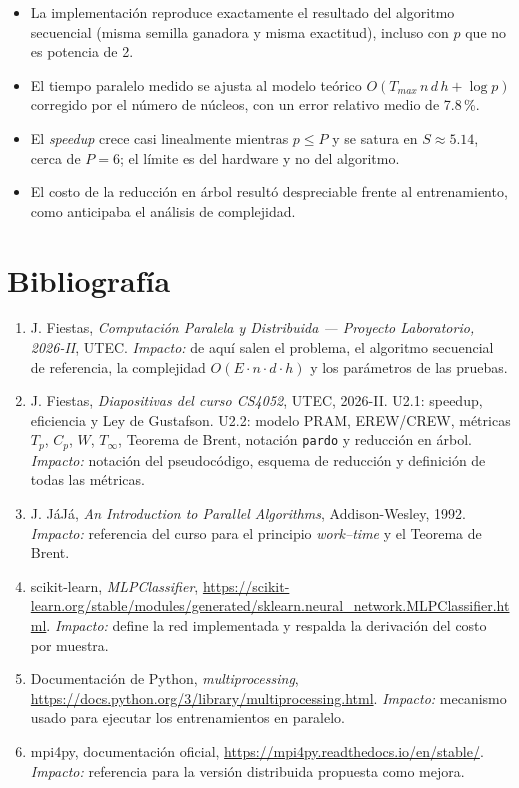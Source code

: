 \documentclass[11pt,a4paper]{article}
\begin{document}
\begin{itemize}[leftmargin=1.2cm]
\item La implementación reproduce exactamente el resultado del algoritmo secuencial (misma semilla ganadora y misma exactitud), incluso con $p$ que no es potencia de 2.
\item El tiempo paralelo medido se ajusta al modelo teórico $O(T_{max}\,n\,d\,h + \log p)$ corregido por el número de núcleos, con un error relativo medio de 7.8\,\%.
\item El \emph{speedup} crece casi linealmente mientras $p \le P$ y se satura en $S \approx 5.14$, cerca de $P = 6$; el límite es del hardware y no del algoritmo.
\item El costo de la reducción en árbol resultó despreciable frente al entrenamiento, como anticipaba el análisis de complejidad.
\end{itemize}

\section{Bibliografía}

\begin{enumerate}[leftmargin=1.2cm]
\item J. Fiestas, \emph{Computación Paralela y Distribuida --- Proyecto Laboratorio, 2026-II}, UTEC. \textit{Impacto:} de aquí salen el problema, el algoritmo secuencial de referencia, la complejidad $O(E\cdot n\cdot d\cdot h)$ y los parámetros de las pruebas.
\item J. Fiestas, \emph{Diapositivas del curso CS4052}, UTEC, 2026-II. U2.1: speedup, eficiencia y Ley de Gustafson. U2.2: modelo PRAM, EREW/CREW, métricas $T_p$, $C_p$, $W$, $T_\infty$, Teorema de Brent, notación \texttt{pardo} y reducción en árbol. \textit{Impacto:} notación del pseudocódigo, esquema de reducción y definición de todas las métricas.
\item J. JáJá, \emph{An Introduction to Parallel Algorithms}, Addison-Wesley, 1992. \textit{Impacto:} referencia del curso para el principio \emph{work--time} y el Teorema de Brent.
\item scikit-learn, \emph{MLPClassifier}, \url{https://scikit-learn.org/stable/modules/generated/sklearn.neural_network.MLPClassifier.html}. \textit{Impacto:} define la red implementada y respalda la derivación del costo por muestra.
\item Documentación de Python, \emph{multiprocessing}, \url{https://docs.python.org/3/library/multiprocessing.html}. \textit{Impacto:} mecanismo usado para ejecutar los entrenamientos en paralelo.
\item mpi4py, documentación oficial, \url{https://mpi4py.readthedocs.io/en/stable/}. \textit{Impacto:} referencia para la versión distribuida propuesta como mejora.
\end{enumerate}
\end{document}
